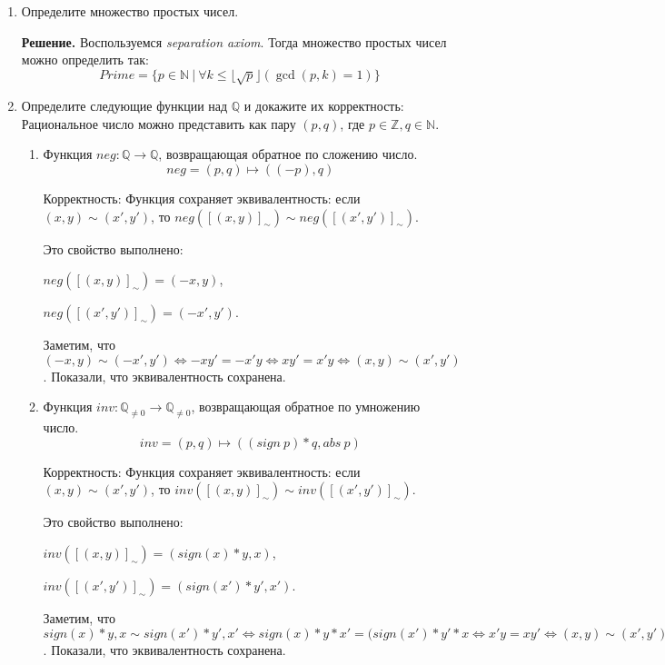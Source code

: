\begin{enumerate}
\item Определите множество простых чисел.

\textbf{Решение.} Воспользуемся \textit{separation axiom}. Тогда множество простых чисел можно определить так:
\begin{equation*}
	Prime = \{p \in \mathbb{N} \ | \ \forall k \leqslant \lfloor \sqrt{p} \rfloor (\gcd(p, k) = 1) \}
\end{equation*}

\item Определите следующие функции над $\mathbb{Q}$ и докажите их корректность: Рациональное число можно 
представить как пару $(p, q)$, где $p \in \mathbb{Z}, q \in \mathbb{N}$. 
\begin{enumerate}
\item Функция $neg : \mathbb{Q} \to \mathbb{Q}$, возвращающая обратное по сложению число.
\begin{equation*}
	neg = (p, q) \mapsto ((-p), q)
\end{equation*}

Корректность: Функция сохраняет эквивалентность: если $(x,y) \sim (x',y')$, то $neg([(x,y)]_\sim) 
\sim neg([(x',y')]_\sim)$. 

Это свойство выполнено: 

$neg([(x,y)]_\sim) = (-x, y)$, 

$neg([(x',y')]_\sim) = (-x', y')$. 

Заметим, что $(-x, y) \sim (-x', y') \Leftrightarrow -xy' = -x'y 
\Leftrightarrow xy' = x'y \Leftrightarrow (x,y) \sim (x',y')$. Показали, что эквивалентность 
сохранена.

\item Функция $inv : \mathbb{Q}_{\neq 0} \to \mathbb{Q}_{\neq 0}$, возвращающая обратное по умножению число.
\begin{equation*}
	inv = (p, q) \mapsto ((sign \ p) * q, abs \ p)
\end{equation*}

Корректность: Функция сохраняет эквивалентность: если $(x,y) \sim (x',y')$, то $inv([(x,y)]_\sim) 
\sim inv([(x',y')]_\sim)$. 

Это свойство выполнено: 

$inv([(x,y)]_\sim) = (sign(x) *y, x)$, 

$inv([(x',y')]_\sim) = (sign(x') * y', x')$. 

Заметим, что $sign(x) *y, x \sim sign(x') * y', x' \Leftrightarrow sign(x) * y * x' = (sign(x') * y' * x 
\Leftrightarrow x'y = xy' \Leftrightarrow (x,y) \sim (x',y')$. Показали, что эквивалентность сохранена.


\end{enumerate}
\end{enumerate}
